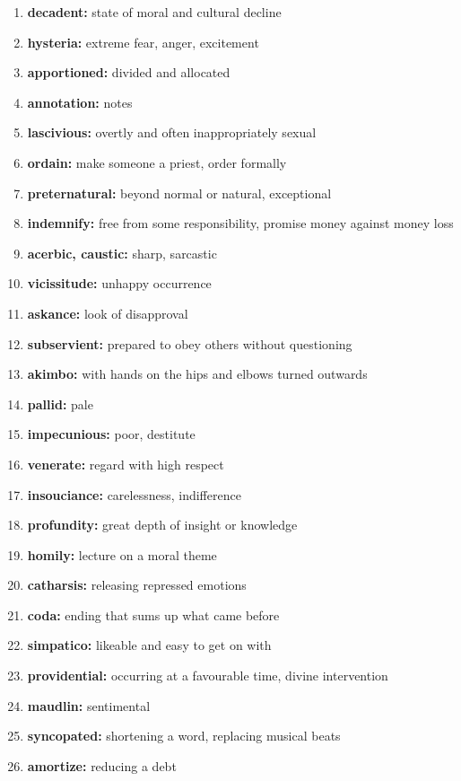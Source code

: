 \documentclass{article}
\begin{document}
\begin{enumerate}
    \item \textbf{decadent: }{state of moral and cultural decline}
    \item \textbf{hysteria: }{extreme fear, anger, excitement}
    \item \textbf{apportioned: }{divided and allocated}
    \item \textbf{annotation: }{notes}
    \item \textbf{lascivious: }{overtly and often inappropriately sexual}
    \item \textbf{ordain: }{make someone a priest, order formally}
    \item \textbf{preternatural: }{beyond normal or natural, exceptional}
    \item \textbf{indemnify: }{free from some responsibility, promise money against money loss}
    \item \textbf{acerbic, caustic: }{sharp, sarcastic}
    \item \textbf{vicissitude: }{unhappy occurrence}
    \item \textbf{askance: }{look of disapproval}
    \item \textbf{subservient: }{prepared to obey others without questioning}
    \item \textbf{akimbo: }{with hands on the hips and elbows turned outwards}
    \item \textbf{pallid: }{pale}
    \item \textbf{impecunious: }{poor, destitute}
    \item \textbf{venerate: }{regard with high respect}
    \item \textbf{insouciance: }{carelessness, indifference}
    \item \textbf{profundity: }{great depth of insight or knowledge}
    \item \textbf{homily: }{lecture on a moral theme}
    \item \textbf{catharsis: }{releasing repressed emotions}
    \item \textbf{coda: }{ending that sums up what came before}
    \item \textbf{simpatico: }{likeable and easy to get on with}
    \item \textbf{providential: }{occurring at a favourable time, divine intervention}
    \item \textbf{maudlin: }{sentimental}
    \item \textbf{syncopated: }{shortening a word, replacing musical beats}
    \item \textbf{amortize: }{reducing a debt}

\end{enumerate}
\end{document}
